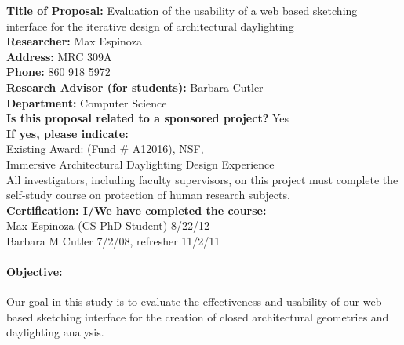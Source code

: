 \documentclass[12pt]{article}
\begin{document}
\noindent
{\bf Title of Proposal:} Evaluation of the usability of a web based 
sketching interface for the iterative design of architectural daylighting \\
{\bf Researcher:}   Max Espinoza\\
{\bf Address:}  MRC 309A\\
{\bf Phone:} 860 918 5972\\ 
{\bf Research Advisor (for students):}  Barbara Cutler \\
{\bf Department:}  Computer Science \\
{\bf Is this proposal related to a sponsored project?}  Yes \\
{\bf If yes,  please indicate:}  \\
Existing Award: (Fund \# A12016), NSF, \\
Immersive Architectural Daylighting Design Experience \\

\noindent
All investigators, including faculty supervisors, on this project must
complete the self-study course on protection of human research
subjects. \\
{\bf Certification:  I/We have completed the course:} \\
Max Espinoza (CS PhD Student) 8/22/12 \\ %
Barbara M Cutler 7/2/08, refresher 11/2/11

\paragraph{Objective:}
Our goal in this study is to evaluate the effectiveness and usability of 
our web based sketching interface for the creation of closed architectural 
geometries and daylighting analysis.
\end{document}
